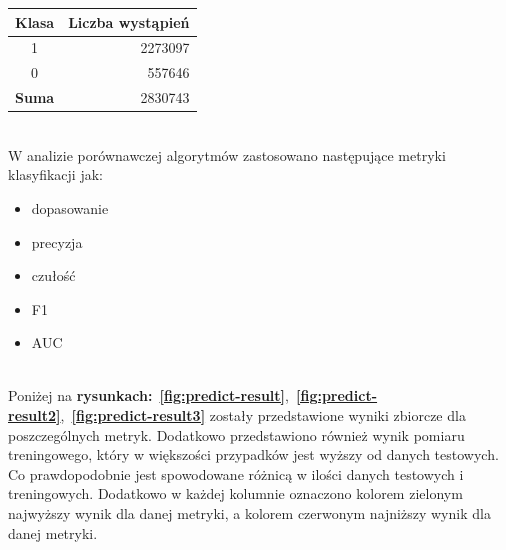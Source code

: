 \begin{table}[H]
    \centering
    \label{tab:res-test}
    \begin{tabular}{|c|r|}
        \hline
        \textbf{Klasa} & \textbf{Liczba wystąpień} \\ \hline
        1              & 2273097                   \\ \hline
        0              & 557646                    \\ \hline
        \textbf{Suma}  & 2830743                   \\ \hline
    \end{tabular}
\end{table}
\ \\
W analizie porównawczej algorytmów zastosowano następujące metryki klasyfikacji jak:
\begin{itemize}
    \item dopasowanie
    \item precyzja
    \item czułość
    \item F1
    \item AUC
\end{itemize}
\ \\
Poniżej na \textbf{rysunkach:}~\textbf{\ref{fig:predict-result}},~\textbf{\ref{fig:predict-result2}},~\textbf{\ref{fig:predict-result3}} zostały przedstawione wyniki zbiorcze dla poszczególnych metryk. Dodatkowo przedstawiono również wynik pomiaru treningowego, który w większości przypadków jest wyższy od danych testowych. Co prawdopodobnie jest spowodowane różnicą w ilości danych testowych i treningowych. Dodatkowo w każdej kolumnie oznaczono kolorem zielonym najwyższy wynik dla danej metryki, a kolorem czerwonym najniższy wynik dla danej metryki.

